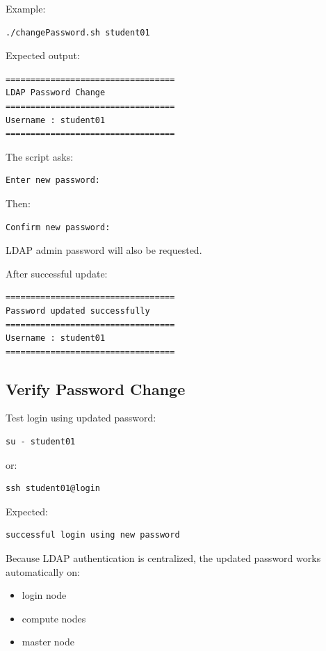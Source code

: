 \documentclass[11pt]{article}
\begin{document}
Example:

\begin{verbatim}
./changePassword.sh student01
\end{verbatim}

Expected output:

\begin{verbatim}
==================================
LDAP Password Change
==================================
Username : student01
==================================
\end{verbatim}

The script asks:

\begin{verbatim}
Enter new password:
\end{verbatim}

Then:

\begin{verbatim}
Confirm new password:
\end{verbatim}

LDAP admin password will also be requested.

After successful update:

\begin{verbatim}
==================================
Password updated successfully
==================================
Username : student01
==================================
\end{verbatim}
\subsection{Verify Password Change}
\label{sec:orgdf1e495}

Test login using updated password:

\begin{verbatim}
su - student01
\end{verbatim}

or:

\begin{verbatim}
ssh student01@login
\end{verbatim}

Expected:

\begin{verbatim}
successful login using new password
\end{verbatim}

Because LDAP authentication is centralized, the updated password works automatically on:

\begin{itemize}
\item login node
\item compute nodes
\item master node
\end{itemize}
\end{document}
